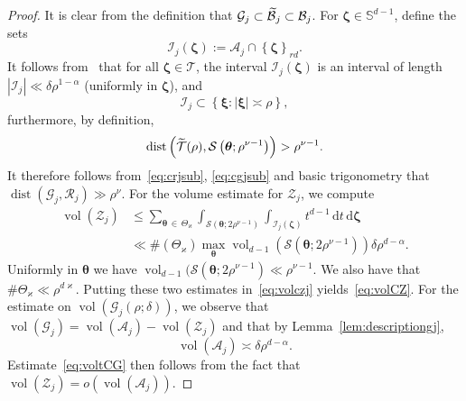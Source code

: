 \documentclass[10pt]{amsart}
\theoremstyle{definition}\newtheorem{defi}[theo]{Definition}\newtheorem{rema}[theo]{Remark}\newtheorem{exam}[theo]{Example}\newtheorem{nota}[theo]{Notation}
\DeclareMathOperator{\vol}{vol}
\DeclareMathOperator{\dist}{dist}
\newcommand{\de}{\, \mathrm{d}}
\newcommand{\BBS}{\mathbb S}
\newcommand{\CA}{\mathcal{A}}
\newcommand{\CB}{\mathcal{B}}
\newcommand{\CG}{\mathcal{G}}
\newcommand{\CI}{\mathcal{I}}
\newcommand{\CR}{\mathcal{R}}
\newcommand{\CS}{\mathcal{S}}
\newcommand{\CT}{\mathcal{T}}
\newcommand{\CZ}{\mathcal{Z}}
\newcommand{\btheta}{\boldsymbol \theta}
\newcommand{\bzeta}{\boldsymbol \zeta}
\newcommand{\bxi}{\boldsymbol \xi}
\newcommand{\smallo}[1]{o\left(#1 \right)}
\newcommand{\abs}[1]{\left\lvert #1 \right\rvert}
\newcommand{\set}[1]{\left\{ #1 \right\}}
\let\oldtilde\tilde
\renewcommand*{\tilde}[1]{\mathchoice{\widetilde{#1}}{\widetilde{#1}}{\oldtilde{#1}}{\oldtilde{#1}}}
\begin{document}
\begin{proof}
It is clear from the definition that $\CG_j \subset \tilde \CB_j \subset
\CB_j$. For $\bzeta \in \BBS^{d-1}$, define the sets
\begin{equation}
\CI_j(\bzeta) := \CA_j \cap \set{\bzeta}_{rd}.
\end{equation}
It follows from~\cite[Equation (8.5)]{ParSob2010} that for all $\bzeta \in
\CT$, the interval $\CI_j(\bzeta)$ is an interval of length $\abs{\CI_j} \ll \delta
\rho^{1 - \alpha}$ (uniformly in $\bzeta$), and
\begin{equation}
\CI_j \subset \set{\bxi : \abs \bxi \asymp \rho },
\end{equation}
furthermore, by definition,
\[
\dist\left(\tilde \CT(\rho), \CS\left(\btheta;\rho^{\nu -1}\right)\right) > \rho^{\nu -1 }.
\]
It therefore follows from~\eqref{eq:crjsub}, \eqref{eq:cgjsub} and basic trigonometry that $\dist(\CG_j,\CR_j) \gg \rho^{\nu}$. For the volume estimate for $\CZ_j$, we compute
\begin{equation}\label{eq:volczj}
\begin{aligned}
\vol(\CZ_j) &\le \sum_{\btheta\,\in\,\Theta_\varkappa} \int_{
\CS\left(\btheta;2 \rho^{\nu - 1}\right)} \int_{\CI_j(\bzeta)} t^{d-1} \de t \de \bzeta \\
& \ll \#(\Theta_\varkappa)\max_{\btheta}\vol_{d-1}\left(
\CS\left(\btheta;2\rho^{\nu-1}\right)\right)\delta\rho^{d - \alpha}.
\end{aligned}
\end{equation}
Uniformly in $\btheta$ we have $\vol_{d-1}(
\CS(\btheta;2\rho^{\nu-1}) \ll \rho^{\nu-1}$. We also have that $\#\Theta_\varkappa \ll
\rho^{d\varkappa}$. Putting these two estimates in~\eqref{eq:volczj} yields~\eqref{eq:volCZ}. For the estimate on $\vol(\CG_j(\rho;\delta))$, we observe that $\vol(\CG_j) = \vol(\CA_j) - \vol(\CZ_j)$ and that by Lemma~\ref{lem:descriptiongj},
\begin{equation}
\vol(\CA_j) \asymp \delta \rho^{d - \alpha}.
\end{equation}
Estimate~\eqref{eq:voltCG} then follows from the fact that $\vol(\CZ_j) =
\smallo{\vol(\CA_j)}$.
\end{proof}
\end{document}
